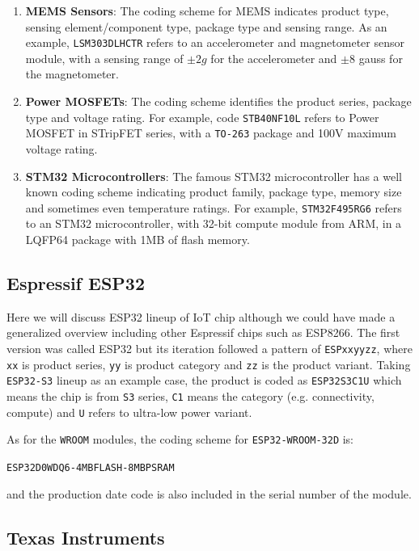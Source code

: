 \begin{enumerate}
    \item \textbf{MEMS Sensors}: The coding scheme for MEMS indicates product type, sensing element/component type, package type and sensing range. As an example, \texttt{LSM303DLHCTR} refers to an accelerometer and magnetometer sensor module, with a sensing range of $\pm 2g$ for the accelerometer and $\pm 8$ gauss for the magnetometer.

    \item \textbf{Power MOSFETs}: The coding scheme identifies the product series, package type and voltage rating. For example, code \texttt{STB40NF10L} refers to Power MOSFET in STripFET series, with a \texttt{TO-263} package and 100V maximum voltage rating.

    \item \textbf{STM32 Microcontrollers}: The famous STM32 microcontroller has a well known coding scheme indicating product family, package type, memory size and sometimes even temperature ratings. For example, \texttt{STM32F495RG6} refers to an STM32 microcontroller, with 32-bit compute module from ARM, in a LQFP64 package with 1MB of flash memory.
\end{enumerate}

\subsection{Espressif ESP32}

Here we will discuss ESP32 lineup of IoT chip although we could have made a generalized overview including other Espressif chips such as ESP8266. The first version was called ESP32 but its iteration followed a pattern of \texttt{ESPxxyyzz}, where \texttt{xx} is product series, \texttt{yy} is product category and \texttt{zz} is the product variant. Taking \texttt{ESP32-S3} lineup as an example case, the product is coded as \texttt{ESP32S3C1U} which means the chip is from \texttt{S3} series, \texttt{C1} means the category (e.g. connectivity, compute) and \texttt{U} refers to ultra-low power variant.

As for the \texttt{WROOM} modules, the coding scheme for \texttt{ESP32-WROOM-32D} is:
\begin{center}
    \texttt{ESP32D0WDQ6-4MB\textunderscore FLASH-8MB\textunderscore PSRAM}
\end{center}  and the production date code is also included in the serial number of the module.


\subsection{Texas Instruments}


